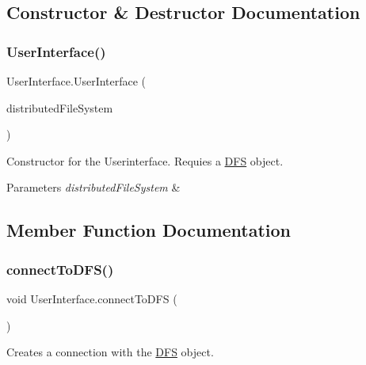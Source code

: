 \subsection{Constructor \& Destructor Documentation}
\mbox{\label{class_user_interface_ae4be0a3dc956ead335dbb0c627847b1f}} 
\subsubsection{\texorpdfstring{User\+Interface()}{UserInterface()}}
{\footnotesize\ttfamily User\+Interface.\+User\+Interface (\begin{DoxyParamCaption}\item[{\mbox{\hyperlink{class_d_f_s}{D\+FS}}}]{distributed\+File\+System }\end{DoxyParamCaption})\hspace{0.3cm}{\ttfamily [inline]}}

Constructor for the Userinterface. Requies a \mbox{\hyperlink{class_d_f_s}{D\+FS}} object. 
\begin{DoxyParams}{Parameters}
{\em distributed\+File\+System} & \\
\hline
\end{DoxyParams}


\subsection{Member Function Documentation}
\mbox{\label{class_user_interface_ac366637e9291b357f85f67a58070e666}} 
\subsubsection{\texorpdfstring{connect\+To\+D\+F\+S()}{connectToDFS()}}
{\footnotesize\ttfamily void User\+Interface.\+connect\+To\+D\+FS (\begin{DoxyParamCaption}{ }\end{DoxyParamCaption})\hspace{0.3cm}{\ttfamily [inline]}}

Creates a connection with the \mbox{\hyperlink{class_d_f_s}{D\+FS}} object. \mbox{\label{class_user_interface_a6ccb02994e74e468304c7c990d83913a}} 
